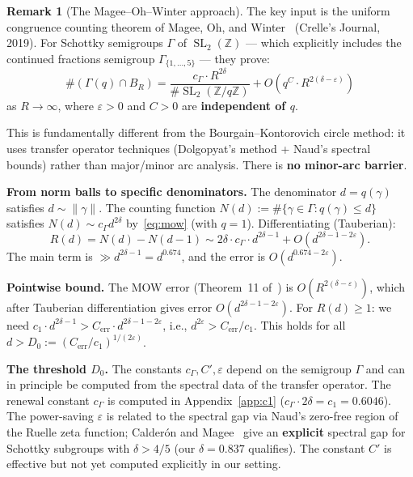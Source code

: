 \documentclass[11pt,a4paper]{amsart}
\theoremstyle{definition}
\newtheorem{remark}[theorem]{Remark}
\DeclareMathOperator{\SL}{SL}
\begin{document}
\begin{remark}[The Magee--Oh--Winter approach]\label{rem:mow}
The key input is the uniform congruence counting theorem of Magee, Oh, and Winter~\cite{MOW2019} (Crelle's Journal, 2019). For Schottky semigroups $\Gamma$ of $\SL_2(\mathbb{Z})$ — which explicitly includes the continued fractions semigroup $\Gamma_{\{1,\ldots,5\}}$ — they prove:
\begin{equation}\label{eq:mow}
\#(\Gamma(q) \cap B_R) = \frac{c_\Gamma \cdot R^{2\delta}}{\#\SL_2(\mathbb{Z}/q\mathbb{Z})} + O(q^C \cdot R^{2(\delta - \varepsilon)})
\end{equation}
as $R \to \infty$, where $\varepsilon > 0$ and $C > 0$ are \textbf{independent of $q$}.

This is fundamentally different from the Bourgain--Kontorovich circle method: it uses transfer operator techniques (Dolgopyat's method + Naud's spectral bounds) rather than major/minor arc analysis. There is \textbf{no minor-arc barrier}.

\textbf{From norm balls to specific denominators.} The denominator $d = q(\gamma)$ satisfies $d \sim \|\gamma\|$. The counting function $N(d) := \#\{\gamma \in \Gamma : q(\gamma) \leq d\}$ satisfies $N(d) \sim c_\Gamma d^{2\delta}$ by~\eqref{eq:mow} (with $q = 1$). Differentiating (Tauberian):
\[
R(d) = N(d) - N(d-1) \sim 2\delta \cdot c_\Gamma \cdot d^{2\delta - 1} + O(d^{2\delta - 1 - 2\varepsilon}).
\]
The main term is $\gg d^{2\delta - 1} = d^{0.674}$, and the error is $O(d^{0.674 - 2\varepsilon})$.

\textbf{Pointwise bound.} The MOW error (Theorem~11 of~\cite{MOW2019}) is $O(R^{2(\delta - \varepsilon)})$, which after Tauberian differentiation gives error $O(d^{2\delta-1-2\varepsilon})$. For $R(d) \geq 1$: we need $c_1 \cdot d^{2\delta-1} > C_{\text{err}} \cdot d^{2\delta-1-2\varepsilon}$, i.e., $d^{2\varepsilon} > C_{\text{err}}/c_1$. This holds for all $d > D_0 := (C_{\text{err}}/c_1)^{1/(2\varepsilon)}$.

\textbf{The threshold $D_0$.} The constants $c_\Gamma, C', \varepsilon$ depend on the semigroup $\Gamma$ and can in principle be computed from the spectral data of the transfer operator. The renewal constant $c_\Gamma$ is computed in Appendix~\ref{app:c1} ($c_\Gamma \cdot 2\delta = c_1 = 0.6046$). The power-saving $\varepsilon$ is related to the spectral gap via Naud's zero-free region of the Ruelle zeta function; Calder\'on and Magee~\cite{CM2025} give an \textbf{explicit} spectral gap for Schottky subgroups with $\delta > 4/5$ (our $\delta = 0.837$ qualifies). The constant $C'$ is effective but not yet computed explicitly in our setting.


\end{remark}
\end{document}
